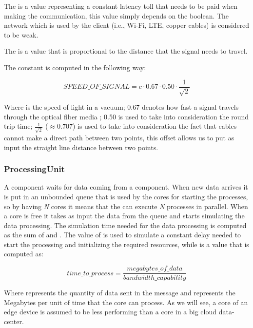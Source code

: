 The  is a value representing a constant latency toll that needs to be paid when making the communication, this value simply depends on the  boolean. The network which is used by the client (i.e., Wi-Fi, LTE, copper cables) is considered to be weak.

The  is a value that is proportional to the distance that the signal needs to travel.

The constant  is computed in the following way:

\[ SPEED\_OF\_SIGNAL = c \cdot 0.67 \cdot 0.50 \cdot \frac{1}{\sqrt{2}} \]

Where  is the speed of light in a vacuum; 0.67 denotes how fast a signal travels through the optical fiber media \cite{optical-fiber-latency}; 0.50 is used to take into consideration the round trip time; \(\frac{1}{\sqrt{2}}\) ($\approx$0.707) is used to take into consideration the fact that cables cannot make a direct path between two points, this offset allows us to put as input the straight line distance between two points.


\subsubsection{ProcessingUnit}
A  component waits for data coming from a  component. When new data arrives it is put in an unbounded queue that is used by the cores for starting the processes, so by having \textit{N} cores it means that the  can execute \textit{N} processes in parallel.
When a core is free it takes as input the data from the queue and starts simulating the data processing. The simulation time needed for the data processing is computed as the sum of  and . The value of  is used to simulate a constant delay needed to start the processing and initializing the required resources, while  is a value that is computed as:

\[ time\_to\_process = \frac{megabytes\_of\_data}{bandwidth\_capability} \]

Where  represents the quantity of data sent in the message and  represents the Megabytes per unit of time that the core can process. As we will see, a core of an edge device is assumed to be less performing than a core in a big cloud data-center.

